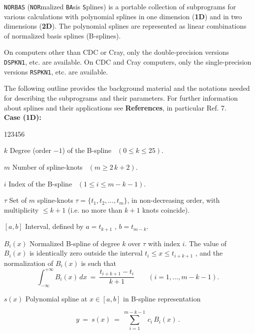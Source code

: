                                 
                   
                           
                               \Revised{}
{\tt NORBAS} ({\tt NOR}malized {\tt BA}sis {\tt S}plines) is a portable
collection of subprograms for various calculations with polynomial
splines in one dimension ({\bf 1D}) and in two dimensions ({\bf 2D}).
The polynomial splines are represented as linear combinations of
normalized basis splines (B-splines).
\par
On computers other than CDC or Cray, only the double-precision versions
{\tt DSPKN1}, etc. are available. On CDC and Cray computers, only the
single-precision versions {\tt RSPKN1}, etc. are available.
\par
The following outline provides the background material and the
notations needed for describing the subprograms
and their parameters. For further information about splines and their
applications see {\bf References}, in particular Ref. 7. \\[3mm]
{\bf Case (1D):}
\begin{DL}{123456}
\item[$k$] Degree (order $-1$) of the B-spline \, $(0 \le k \le 25)$.
\item[$m$] Number of spline-knots \, $( m \ge 2 \, k+2 )$.
\item[$i$] Index of the B-spline \, $(1 \le i \le m-k-1)$.
\item[$\tau$] Set of $m$ spline-knots $\tau = \{t_1,t_2, \ldots ,t_m \}$,
 in non-decreasing order, with multiplicity $\le k+1$
 (i.e. no more than $k+1$ knots coincide).
\item[{$[a,b]$}] Interval, defined by $a=t_{k+1}$ , $b=t_{m-k}$.
\item[$B_i(x)$] Normalized B-spline of degree $k$ over $\tau$ with
 index $i$. The value of $B_i(x)$ is identically zero outside the
 interval $t_i \le x \le t_{i+k+1}$ , and the normalization of $B_i(x)$
 is such that
 $$ \int_{- \infty}^{+ \infty} B_i(x)\,dx \ = \ \frac{t_{i+k+1}-t_i}{k+1}
 \qquad (i = 1, \ldots , m-k-1). $$
\item[$s(x)$] Polynomial spline at $x \in [a,b]$ in B-spline
 representation
\end{DL}
$$ y \ = \ s(x) \ = \ \sum_{i=1}^{m-k-1} \, c_i\,B_i(x) \, .$$
